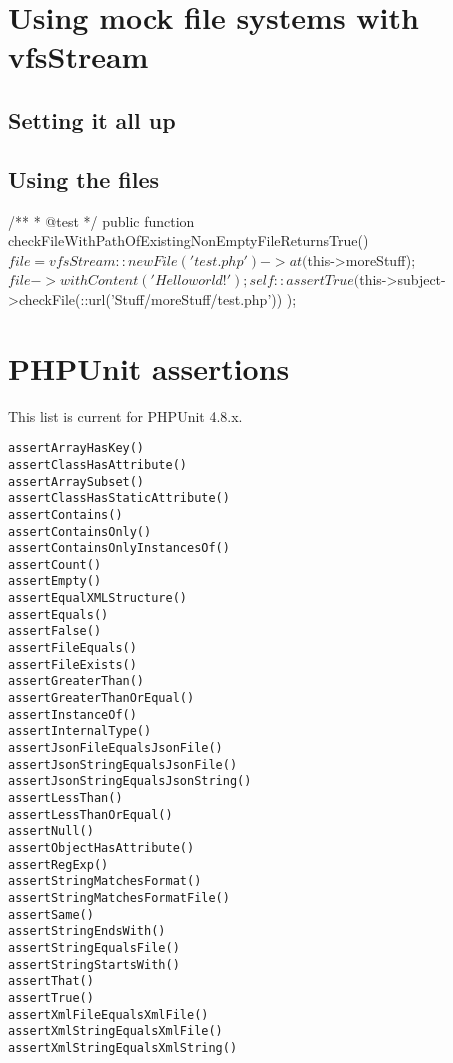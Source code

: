 \documentclass[a4paper,10pt]{scrartcl}
\begin{document}
\section{Using mock file systems with vfsStream}
\subsection{Setting it all up}

\subsection{Using the files}
\begin{phpcode}
/**
 * @test
 */
public function checkFileWithPathOfExistingNonEmptyFileReturnsTrue() {
  $file = vfsStream::newFile('test.php')->at($this->moreStuff);
  $file->withContent('Hello world!');

  self::assertTrue(
    $this->subject->checkFile(\vfsStream::url('Stuff/moreStuff/test.php'))
  );
}
\end{phpcode}


\section{PHPUnit assertions}
This list is current for PHPUnit 4.8.x.

\begin{verbatim}
assertArrayHasKey()
assertClassHasAttribute()
assertArraySubset()
assertClassHasStaticAttribute()
assertContains()
assertContainsOnly()
assertContainsOnlyInstancesOf()
assertCount()
assertEmpty()
assertEqualXMLStructure()
assertEquals()
assertFalse()
assertFileEquals()
assertFileExists()
assertGreaterThan()
assertGreaterThanOrEqual()
assertInstanceOf()
assertInternalType()
assertJsonFileEqualsJsonFile()
assertJsonStringEqualsJsonFile()
assertJsonStringEqualsJsonString()
assertLessThan()
assertLessThanOrEqual()
assertNull()
assertObjectHasAttribute()
assertRegExp()
assertStringMatchesFormat()
assertStringMatchesFormatFile()
assertSame()
assertStringEndsWith()
assertStringEqualsFile()
assertStringStartsWith()
assertThat()
assertTrue()
assertXmlFileEqualsXmlFile()
assertXmlStringEqualsXmlFile()
assertXmlStringEqualsXmlString()
\end{verbatim}
\end{document}
